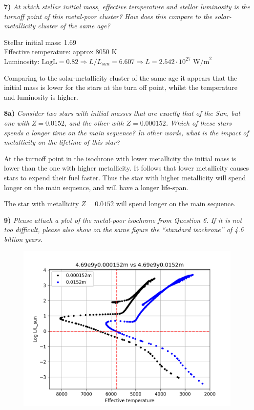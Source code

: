 \documentclass[11pt,a4paper]{article}
\begin{document}
    \textbf{7)} \textit{At which stellar initial mass, effective temperature and stellar luminosity is the turnoff point
    of this metal-poor cluster?
    How does this compare to the solar-metallicity cluster of the same age?}

    Stellar initial mass: 1.69\\
    Effective temperature: approx 8050 K\\
    Luminosity: $\textrm{LogL} = 0.82 \Rightarrow L/L_{sun} = 6.607 \Rightarrow L = 2.542 \cdot 10^{27} \textrm{ W/m}^2$

    Comparing to the solar-metallicity cluster of the same age it appears that the initial mass is lower for the stars at the turn off point, whilst the temperature and luminosity is higher.

    \textbf{8a)} \textit{Consider two stars with initial masses that are exactly that of the Sun, but one with
    $Z=0.0152$, and the other with $Z=0.000152$. Which of these stars spends a longer time on the main sequence? In other words, what is the impact of metallicity on the lifetime of this star?}

    At the turnoff point in the isochrone with lower metallicity the initial mass is lower than the one with higher metallicity.
    It follows that lower metallicity causes stars to expend their fuel faster.
    Thus the star with higher metallicity will spend longer on the main sequence, and will have a longer life-span.

    The star with metallicity $Z=0.0152$ will spend longer on the main sequence.

    \newpage
    \textbf{9)} \textit{Please attach a plot of the metal-poor isochrone from Question 6. If it is not too difficult,
        please also show on the same figure the “standard isochrone” of 4.6 billion years.}

    \begin{figure}[h]
        \centering
        \includegraphics[width=12cm]{figures/0.000152m_vs_0.0152m}
        \label{fig:metallicityComparison}
    \end{figure}
\end{document}
